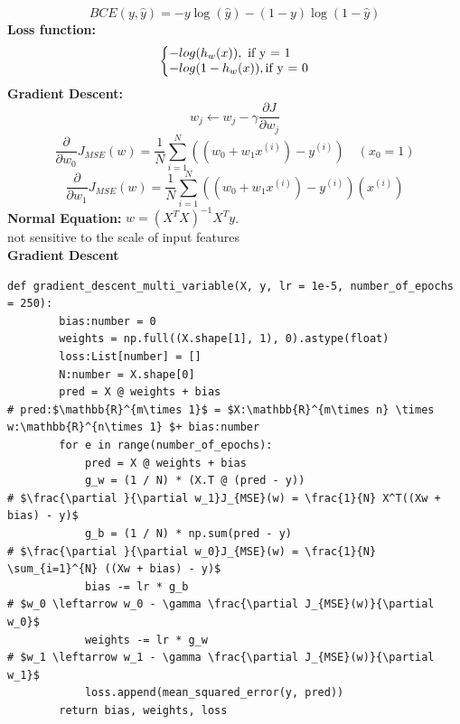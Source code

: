 \documentclass[8pt,twocolumn]{article}
\makeatletter
\newenvironment{system}%
{\left\lbrace\begin{array}{@{}l@{}}}%
{\end{array}\right.}
\makeatother
\begin{document}
\begin{equation}
    BCE(y, \hat{y}) = -y\log(\hat{y}) - (1 - y)\log(1 - \hat{y})
\end{equation}
\textbf{Loss function:}
\begin{equation}
    \begin{system}
    -log(h_w(x)), \text{ if y = 1}\\
    -log(1 - h_w(x)), \text{if y = 0}
    \end{system}
\end{equation}
\textbf{Gradient Descent:}
\begin{equation}
    w_j \leftarrow w_j - \gamma \frac{\partial J}{\partial w_j}
\end{equation}
    \[\frac{\partial }{\partial w_0} J_{MSE}(w)= \frac{1}{N} \sum_{i=1}^{N}((w_0 + w_1 x^{(i)}) - y^{(i)}) \quad {(x_0 = 1)}\]
    \[\frac{\partial }{\partial w_1} J_{MSE}(w)= \frac{1}{N} \sum_{i=1}^{N}((w_0 + w_1 x^{(i)}) - y^{(i)})(x^{(i)})\]
\textbf{Normal Equation:} $w = (X^TX)^{-1}X^Ty$.\\ 
not sensitive to the scale of input features\\
\textbf{Gradient Descent}\vspace{-0.6em}
\begin{lstlisting}[mathescape=true]
    def gradient_descent_multi_variable(X, y, lr = 1e-5, number_of_epochs = 250):
        bias:number = 0
        weights = np.full((X.shape[1], 1), 0).astype(float)
        loss:List[number] = []
        N:number = X.shape[0]  
        pred = X @ weights + bias       
# pred:$\mathbb{R}^{m\times 1}$ = $X:\mathbb{R}^{m\times n} \times w:\mathbb{R}^{n\times 1} $+ bias:number
        for e in range(number_of_epochs): 
            pred = X @ weights + bias
            g_w = (1 / N) * (X.T @ (pred - y)) 
# $\frac{\partial }{\partial w_1}J_{MSE}(w) = \frac{1}{N} X^T((Xw + bias) - y)$
            g_b = (1 / N) * np.sum(pred - y)   
# $\frac{\partial }{\partial w_0}J_{MSE}(w) = \frac{1}{N} \sum_{i=1}^{N} ((Xw + bias) - y)$
            bias -= lr * g_b                   
# $w_0 \leftarrow w_0 - \gamma \frac{\partial J_{MSE}(w)}{\partial w_0}$
            weights -= lr * g_w                
# $w_1 \leftarrow w_1 - \gamma \frac{\partial J_{MSE}(w)}{\partial w_1}$
            loss.append(mean_squared_error(y, pred))
        return bias, weights, loss  
    \end{lstlisting}
\vspace{-1.2em}
\end{document}
